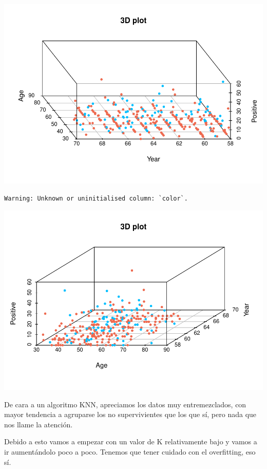 \documentclass[
]{article}
\begin{document}
\begin{center}\includegraphics{Clasificacion_files/figure-latex/unnamed-chunk-8-1} \end{center}

\begin{verbatim}
Warning: Unknown or uninitialised column: `color`.
\end{verbatim}

\begin{center}\includegraphics{Clasificacion_files/figure-latex/unnamed-chunk-8-2} \end{center}

De cara a un algoritmo KNN, apreciamos los datos muy entremezclados, con
mayor tendencia a agruparse los no supervivientes que los que sí, pero
nada que nos llame la atención.

Debido a esto vamos a empezar con un valor de K relativamente bajo y
vamos a ir aumentándolo poco a poco. Tenemos que tener cuidado con el
overfitting, eso sí.
\end{document}
